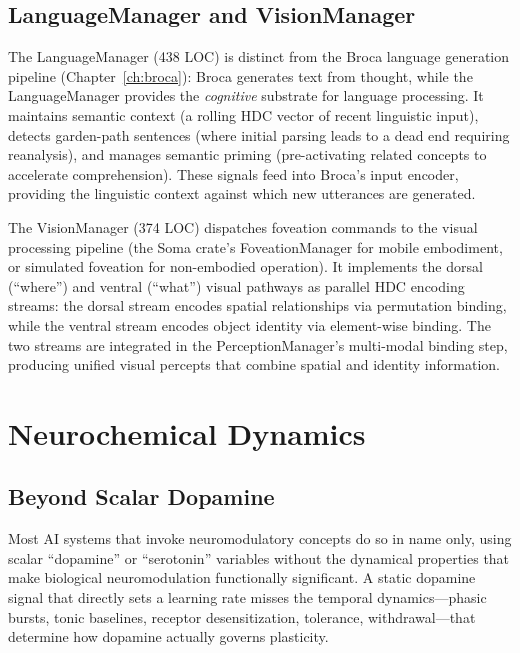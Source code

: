 \documentclass[12pt]{book}
\begin{document}
\section{LanguageManager and VisionManager}

The LanguageManager (438 LOC) is distinct from the Broca language generation pipeline (Chapter~\ref{ch:broca}): Broca generates text from thought, while the LanguageManager provides the \textit{cognitive} substrate for language processing. It maintains semantic context (a rolling HDC vector of recent linguistic input), detects garden-path sentences (where initial parsing leads to a dead end requiring reanalysis), and manages semantic priming (pre-activating related concepts to accelerate comprehension). These signals feed into Broca's input encoder, providing the linguistic context against which new utterances are generated.

The VisionManager (374 LOC) dispatches foveation commands to the visual processing pipeline (the Soma crate's FoveationManager for mobile embodiment, or simulated foveation for non-embodied operation). It implements the dorsal (``where'') and ventral (``what'') visual pathways as parallel HDC encoding streams: the dorsal stream encodes spatial relationships via permutation binding, while the ventral stream encodes object identity via element-wise binding. The two streams are integrated in the PerceptionManager's multi-modal binding step, producing unified visual percepts that combine spatial and identity information.


\chapter{Neurochemical Dynamics}
\label{ch:neuro}

\section{Beyond Scalar Dopamine}

Most AI systems that invoke neuromodulatory concepts do so in name only, using scalar ``dopamine'' or ``serotonin'' variables without the dynamical properties that make biological neuromodulation functionally significant. A static dopamine signal that directly sets a learning rate misses the temporal dynamics---phasic bursts, tonic baselines, receptor desensitization, tolerance, withdrawal---that determine how dopamine actually governs plasticity.
\end{document}
